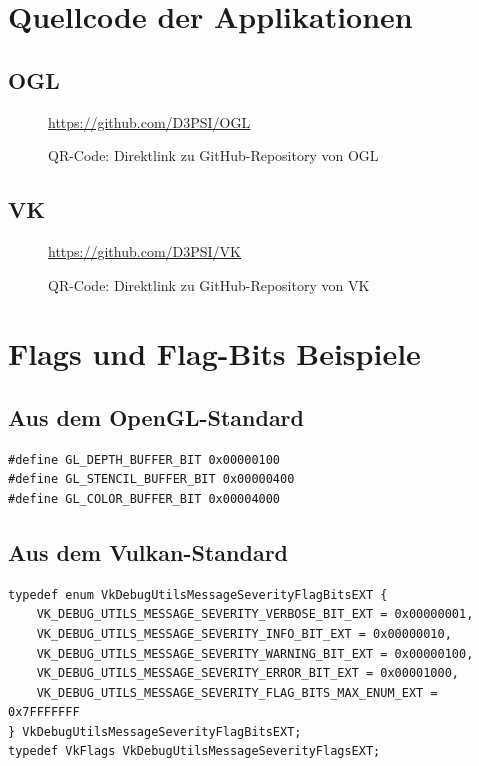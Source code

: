 \documentclass[titlepage, 11pt, a4paper, ngerman]{article}
\begin{document}
\section{Quellcode der Applikationen}

\subsection{OGL}
\begin{figure}[ht]
    \centering
    \url{https://github.com/D3PSI/OGL} \bigbreak
    \caption{QR-Code: Direktlink zu \gls{GitHub}-Repository von OGL}
    \label{fig:ogl-qrcode}
\end{figure}
\bigbreak

\subsection{VK}
\begin{figure}[ht]
    \centering
    \url{https://github.com/D3PSI/VK} \bigbreak
    \caption{QR-Code: Direktlink zu \gls{GitHub}-Repository von VK}
    \label{fig:vk-qrcode}
\end{figure}
\bigbreak

\newpage
\section{Flags und Flag-Bits Beispiele}
\subsection{Aus dem OpenGL-Standard}
\begin{verbatim}
#define GL_DEPTH_BUFFER_BIT 0x00000100
#define GL_STENCIL_BUFFER_BIT 0x00000400
#define GL_COLOR_BUFFER_BIT 0x00004000
\end{verbatim}

\subsection{Aus dem Vulkan-Standard}
\begin{verbatim}
typedef enum VkDebugUtilsMessageSeverityFlagBitsEXT {
    VK_DEBUG_UTILS_MESSAGE_SEVERITY_VERBOSE_BIT_EXT = 0x00000001,
    VK_DEBUG_UTILS_MESSAGE_SEVERITY_INFO_BIT_EXT = 0x00000010,
    VK_DEBUG_UTILS_MESSAGE_SEVERITY_WARNING_BIT_EXT = 0x00000100,
    VK_DEBUG_UTILS_MESSAGE_SEVERITY_ERROR_BIT_EXT = 0x00001000,
    VK_DEBUG_UTILS_MESSAGE_SEVERITY_FLAG_BITS_MAX_ENUM_EXT = 0x7FFFFFFF
} VkDebugUtilsMessageSeverityFlagBitsEXT;
typedef VkFlags VkDebugUtilsMessageSeverityFlagsEXT;
\end{verbatim}
\end{document}
